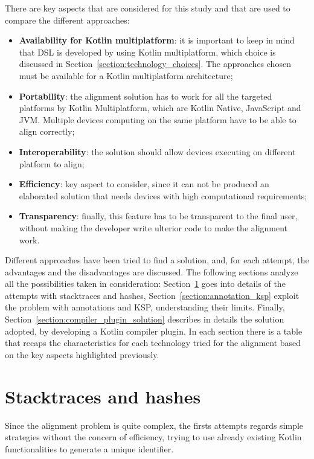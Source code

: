 There are key aspects that are considered for this study and that are used to compare the different approaches:
\begin{itemize}
    \item \textbf{Availability for Kotlin multiplatform}: it is important to keep in mind that DSL is developed by using Kotlin multiplatform, which choice is discussed in Section~\ref{section:technology_choices}. The approaches chosen must be available for a Kotlin multiplatform architecture;
    \item \textbf{Portability}: the alignment solution has to work for all the targeted platforms by Kotlin Multiplatform, which are Kotlin Native, JavaScript and JVM. Multiple devices computing on the same platform have to be able to align correctly;
    \item \textbf{Interoperability}: the solution should allow devices executing on different platform to align;
    \item \textbf{Efficiency}: key aspect to consider, since it can not be produced an elaborated solution that needs devices with high computational requirements;
    \item \textbf{Transparency}: finally, this feature has to be transparent to the final user, without making the developer write ulterior code to make the alignment work.
\end{itemize}

Different approaches have been tried to find a solution, and, for each attempt, the advantages and the disadvantages are discussed. The following sections analyze all the possibilities taken in consideration: Section~\ref{section:stacktraces_hashes} goes into details of the attempts with stacktraces and hashes, Section~\ref{section:annotation_ksp} exploit the problem with annotations and KSP, understanding their limits. Finally, Section~\ref{section:compiler_plugin_solution} describes in details the solution adopted, by developing a Kotlin compiler plugin. In each section there is a table that recaps the characteristics for each technology tried for the alignment based on the key aspects highlighted previously.

\section{Stacktraces and hashes}\label{section:stacktraces_hashes}
Since the alignment problem is quite complex, the firsts attempts regards simple strategies without the concern of efficiency, trying to use already existing Kotlin functionalities to generate a unique identifier.

